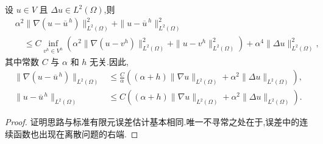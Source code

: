 \begin{lemma}[以 $u$ 表示的离散微分滤波误差估计]
\label{lem:leray-alpha-discrete-filter-error}
设 $u\in V$ 且 $\Delta u\in L^2(\Omega)$,则
\begin{equation}\label{eq:leray-alpha-discrete-filter-error-best-approximation}
\begin{aligned}
 &\alpha^2\|\nabla(u-\overline{u}^{\,h})\|_{L^2(\Omega)}^2
  +\|u-\overline{u}^{\,h}\|_{L^2(\Omega)}^2\\
 &\quad\le C\inf_{v^h\in V^h}
   \left(\alpha^2\|\nabla(u-v^h)\|_{L^2(\Omega)}^2
        +\|u-v^h\|_{L^2(\Omega)}^2\right)
        +\alpha^4\|\Delta u\|_{L^2(\Omega)}^2,
\end{aligned}
\end{equation}
其中常数 $C$ 与 $\alpha$ 和 $h$ 无关.因此,
\begin{align}
 \|\nabla(u-\overline{u}^{\,h})\|_{L^2(\Omega)}
 &\le \frac{C}{\alpha}
   \left((\alpha+h)\|\nabla u\|_{L^2(\Omega)}
       +\alpha^2\|\Delta u\|_{L^2(\Omega)}\right),\label{eq:leray-alpha-discrete-filter-H1-error}\\
 \|u-\overline{u}^{\,h}\|_{L^2(\Omega)}
 &\le C\left((\alpha+h)\|\nabla u\|_{L^2(\Omega)}
       +\alpha^2\|\Delta u\|_{L^2(\Omega)}\right).\label{eq:leray-alpha-discrete-filter-L2-error}
\end{align}
\begin{proof}
证明思路与标准有限元误差估计基本相同.唯一不寻常之处在于,误差中的连续函数也出现在离散问题的右端.


\end{proof}
\end{lemma}
